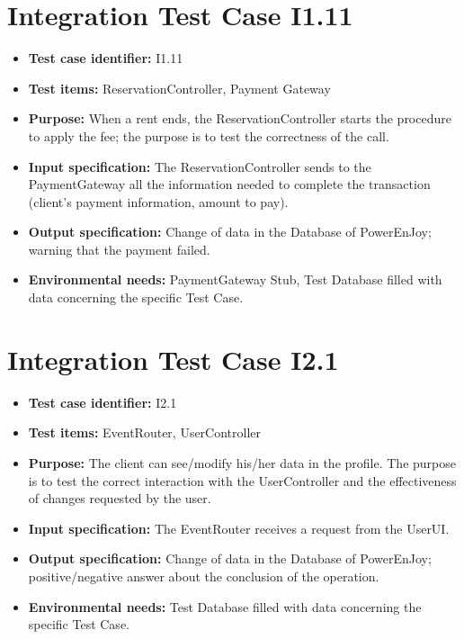 \section{Integration Test Case I1.11}
\begin{itemize}
\item \textbf{Test case identifier:} I1.11
\item \textbf{Test items:} ReservationController, Payment Gateway
\item \textbf{Purpose:} When a rent ends, the ReservationController starts the procedure to apply the fee; the purpose is to test the correctness of the call.
\item \textbf{Input specification:} The ReservationController sends to the PaymentGateway all the information needed to complete the transaction (client’s payment information, amount to pay).
\item \textbf{Output specification:} Change of data in the Database of PowerEnJoy; warning that the payment failed.
\item \textbf{Environmental needs:} PaymentGateway Stub, Test Database filled with data concerning the specific Test Case.
\end{itemize}

\section{Integration Test Case I2.1}
\begin{itemize}
\item \textbf{Test case identifier:} I2.1
\item \textbf{Test items:} EventRouter, UserController
\item \textbf{Purpose:} The client can see/modify his/her data in the profile. The purpose is to test the correct interaction with the UserController and the effectiveness of changes requested by the user.
\item \textbf{Input specification:} The EventRouter receives a request from the UserUI.
\item \textbf{Output specification:} Change of data in the Database of PowerEnJoy; positive/negative answer about the conclusion of the operation.
\item \textbf{Environmental needs:} Test Database filled with data concerning the specific Test Case.
\end{itemize}

